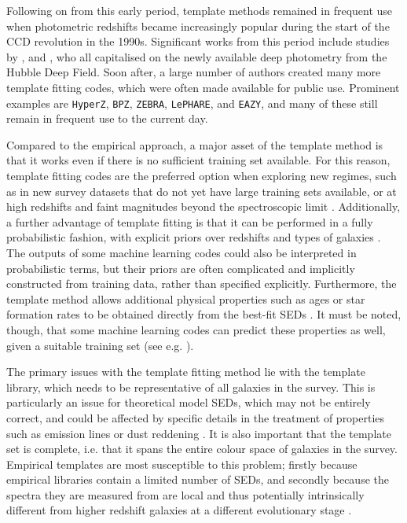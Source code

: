 Following on from this early period, template methods remained in frequent use when photometric redshifts became increasingly popular during the start of the CCD revolution in the 1990s.  Significant works from this period include studies by \cite{1996Natur.381..759L}, \cite{1996ApJ...468L..77G} and \cite{1999ApJ...513...34F}, who all capitalised on the newly available deep photometry from the Hubble Deep Field. Soon after, a large number of authors created many more template fitting codes, which were often made available for public use. Prominent examples are \texttt{HyperZ}, \texttt{BPZ},  \texttt{ZEBRA},  \texttt{LePHARE}, and \texttt{EAZY}, and many of these still remain in frequent use to the current day. \par 


Compared to the empirical approach, a major asset of the template method is that it works even if there is no sufficient training set available. For this reason, template fitting codes are the preferred option when exploring new regimes, such as in new survey datasets that do not yet have large training sets available, or at high redshifts and faint magnitudes beyond the spectroscopic limit \citep{2011Ap&SS.331....1W,2017ApJ...838....5L}.  Additionally, a further advantage of template fitting is that it can be performed in a fully probabilistic fashion, with explicit priors over redshifts and types of galaxies \citep{2000ApJ...536..571B,2017ApJ...838....5L}. The outputs of some machine learning codes could also be interpreted in probabilistic terms, but their priors are often complicated and implicitly constructed from training data, rather than specified explicitly. Furthermore, the template method allows additional physical properties such as ages or star formation rates to be obtained directly from the best-fit SEDs \citep{2011Ap&SS.331....1W,2017ApJ...838....5L}. It must be noted, though, that some machine learning codes can predict these properties as well, given a suitable training set (see e.g. \citealt{2004MNRAS.348.1038B}). \par


The primary issues with the template fitting method lie with the template library, which needs to be representative of all galaxies in the survey. This is particularly an issue for theoretical model SEDs, which may not be entirely correct, and could be affected by specific details in the treatment of properties such as emission lines or dust reddening \citep{2011Ap&SS.331....1W}. It is also important that the template set is complete, i.e. that it spans the entire colour space of galaxies in the survey. Empirical templates are most susceptible to this problem; firstly because empirical libraries contain a limited number of SEDs, and secondly because the spectra they are measured from are local and thus potentially intrinsically different from higher redshift galaxies at a different evolutionary stage \citep{2011Ap&SS.331....1W}. \par 

